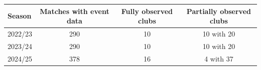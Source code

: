 \begin{tabular}{lccc}
\toprule
Season & Matches with event data & Fully observed clubs & Partially observed clubs \\
\midrule
2022/23 & 290 & 10 & 10 with 20 \\
2023/24 & 290 & 10 & 10 with 20 \\
2024/25 & 378 & 16 & 4 with 37 \\
\bottomrule
\end{tabular}
